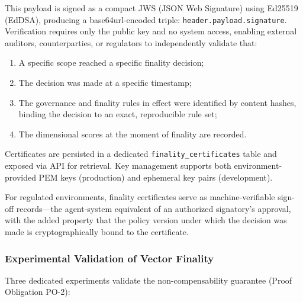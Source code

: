 \documentclass[11pt]{article}
\begin{document}
This payload is signed as a compact JWS (JSON Web Signature) using Ed25519 (EdDSA), producing a base64url-encoded triple: \texttt{header.payload.signature}. Verification requires only the public key and no system access, enabling external auditors, counterparties, or regulators to independently validate that:

\begin{enumerate}
  \item A specific scope reached a specific finality decision;
  \item The decision was made at a specific timestamp;
  \item The governance and finality rules in effect were identified by content hashes, binding the decision to an exact, reproducible rule set;
  \item The dimensional scores at the moment of finality are recorded.
\end{enumerate}

Certificates are persisted in a dedicated \texttt{finality\_certificates} table and exposed via API for retrieval. Key management supports both environment-provided PEM keys (production) and ephemeral key pairs (development).

For regulated environments, finality certificates serve as machine-verifiable sign-off records---the agent-system equivalent of an authorized signatory's approval, with the added property that the policy version under which the decision was made is cryptographically bound to the certificate.

\subsubsection{Experimental Validation of Vector Finality}
\label{sec:experimental-validation}

Three dedicated experiments validate the non-compensability guarantee (Proof Obligation PO-2):
\end{document}
